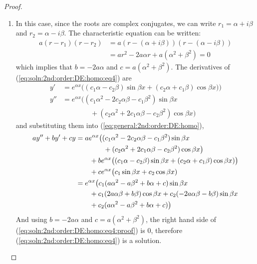 \begin{proof}
\begin{enumerate}
\item In this case, since the roots are complex conjugates, we can write $r_1=\alpha+i\beta $ and $r_2=\alpha-i\beta$.  The characteristic equation can be written:
%
\begin{align*}
a(r-r_1)(r-r_2) & = a(r-(\alpha + i \beta))(r-(\alpha-i\beta)) \\
& = a r^2 - 2 a \alpha r + a(\alpha^2+\beta^2) = 0  
\end{align*}
which implies that $b=-2a \alpha$ and $c=a(\alpha^2+\beta^2)$.  
The derivatives of (\ref{eq:soln:2nd:order:DE:homo:eq4}) are
%
\begin{align*}
y' & = e^{\alpha x} \bigl( (c_1 \alpha - c_2 \beta) \sin \beta x + (c_2 \alpha + c_1 \beta) \cos \beta x) \bigr) \\
y'' & = e^{\alpha x} \bigl( (c_1 \alpha^2 -2 c_2 \alpha \beta - c_1 \beta^2) \sin \beta x \\
& \qquad \qquad + (c_2 \alpha^2 + 2 c_1 \alpha \beta - c_2 \beta^2) \cos \beta x\bigr) 
\end{align*}
and substituting them into (\ref{eq:general:2nd:order:DE:homo}), 
%
\begin{align}
a y'' + by' + cy & = a e^{\alpha x} \bigl( (c_1 \alpha^2 -2 c_2 \alpha \beta - c_1 \beta^2) \sin \beta x   \notag \\
& \qquad \qquad + (c_2 \alpha^2 + 2 c_1 \alpha \beta - c_2 \beta^2) \cos \beta x\bigr) \notag \\
& \qquad + b e^{\alpha x} \bigl( (c_1 \alpha - c_2 \beta) \sin \beta x + (c_2 \alpha + c_1 \beta) \cos \beta x) \bigr)  \notag \\\
& \qquad + c e^{\alpha x} \bigl( c_1 \sin \beta x + c_2 \cos \beta x) \notag \\\
& = e^{\alpha x} \bigl ( c_1 (a\alpha^2-a\beta^2 +b\alpha + c) \sin \beta x   \notag \ \\
& \qquad + c_1 (2a\alpha\beta+b\beta) \cos \beta x + c_2 (-2a\alpha \beta-b\beta) \sin \beta x   \notag \\\
& \qquad + c_2 (a \alpha^2 - a \beta^2 + b \alpha + c) \bigr)  \label{eq:soln:2nd:order:DE:homo:eq4:proof}
\end{align}
And using $b=-2a\alpha$ and $c=a(\alpha^2+\beta^2)$, the right hand side of (\ref{eq:soln:2nd:order:DE:homo:eq4:proof}) is 0, therefore 
(\ref{eq:soln:2nd:order:DE:homo:eq4}) is a solution. 

\end{enumerate}

~
\end{proof}






